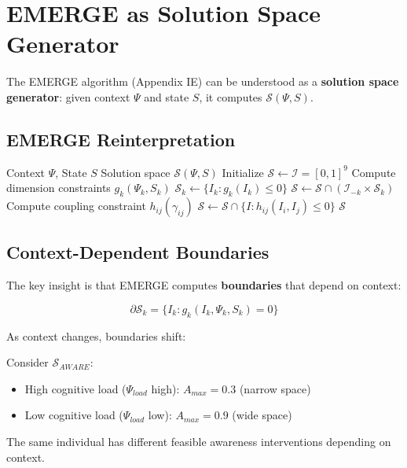 \section{EMERGE as Solution Space Generator}
\label{sec:ss-emerge}

The EMERGE algorithm (Appendix IE) can be understood as a \textbf{solution space generator}: given context $\Psi$ and state $S$, it computes $\mathcal{S}(\Psi, S)$.

\subsection{EMERGE Reinterpretation}

\begin{algorithm}[H]
\caption{EMERGE as Solution Space Generator}
\begin{algorithmic}[1]
\REQUIRE Context $\Psi$, State $S$
\ENSURE Solution space $\mathcal{S}(\Psi, S)$
\STATE Initialize $\mathcal{S} \leftarrow \mathcal{I} = [0,1]^9$ 
    \STATE Compute dimension constraints $g_k(\Psi_k, S_k)$
    \STATE $\mathcal{S}_k \leftarrow \{I_k : g_k(I_k) \leq 0\}$
    \STATE $\mathcal{S} \leftarrow \mathcal{S} \cap (\mathcal{I}_{-k} \times \mathcal{S}_k)$ 
\ENDFOR
{}
    \STATE Compute coupling constraint $h_{ij}(\gamma_{ij})$
    \STATE $\mathcal{S} \leftarrow \mathcal{S} \cap \{I : h_{ij}(I_i, I_j) \leq 0\}$ 
\ENDFOR
\RETURN $\mathcal{S}$
\end{algorithmic}
\end{algorithm}

\subsection{Context-Dependent Boundaries}

The key insight is that EMERGE computes \textbf{boundaries} that depend on context:

\begin{equation}
\partial \mathcal{S}_k = \{I_k : g_k(I_k, \Psi_k, S_k) = 0\}
\end{equation}

As context changes, boundaries shift:

\begin{example}
Consider $\mathcal{S}_{AWARE}$:
\begin{itemize}
    \item High cognitive load ($\Psi_{load}$ high): $A_{max} = 0.3$ (narrow space)
    \item Low cognitive load ($\Psi_{load}$ low): $A_{max} = 0.9$ (wide space)
\end{itemize}
The same individual has different feasible awareness interventions depending on context.
\end{example}

